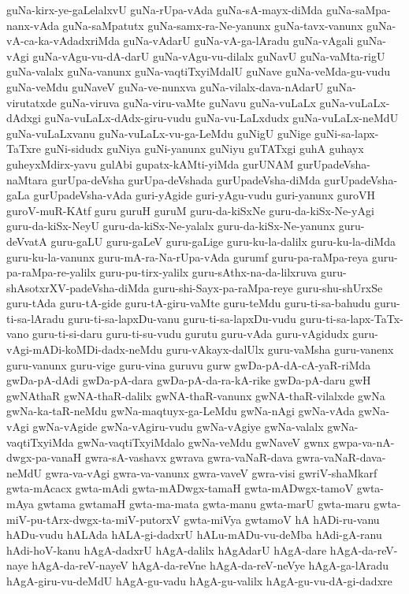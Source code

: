 {guNa-kirx-ye-gaLelalxvU
guNa-rUpa-vAda
guNa-sA-mayx-diMda
guNa-saMpa-nanx-vAda
guNa-saMpatutx
guNa-samx-ra-Ne-yanunx
guNa-tavx-vanunx
guNa-vA-ca-ka-vAdadxriMda
guNa-vAdarU
guNa-vA-ga-lAradu
guNa-vAgali
guNa-vAgi
guNa-vAgu-vu-dA-darU
guNa-vAgu-vu-dilalx
guNavU
guNa-vaMta-rigU
guNa-valalx
guNa-vanunx
guNa-vaqtiTxyiMdalU
guNave
guNa-veMda-gu-vudu
guNa-veMdu
guNaveV
guNa-ve-nunxva
guNa-vilalx-dava-nAdarU
guNa-virutatxde
guNa-viruva
guNa-viru-vaMte
guNavu
guNa-vuLaLx
guNa-vuLaLx-dAdxgi
guNa-vuLaLx-dAdx-giru-vudu
guNa-vu-LaLxdudx
guNa-vuLaLx-neMdU
guNa-vuLaLxvanu
guNa-vuLaLx-vu-ga-LeMdu
guNigU
guNige
guNi-sa-lapx-TaTxre
guNi-sidudx
guNiya
guNi-yanunx
guNiyu
guTATxgi
guhA
guhayx
guheyxMdirx-yavu
gulAbi
gupatx-kAMti-yiMda
gurUNAM
gurUpadeVsha-naMtara
gurUpa-deVsha
gurUpa-deVshada
gurUpadeVsha-diMda
gurUpadeVsha-gaLa
gurUpadeVsha-vAda
guri-yAgide
guri-yAgu-vudu
guri-yanunx
guroVH
guroV-muR-KAtf
guru
guruH
guruM
guru-da-kiSxNe
guru-da-kiSx-Ne-yAgi
guru-da-kiSx-NeyU
guru-da-kiSx-Ne-yalalx
guru-da-kiSx-Ne-yanunx
guru-deVvatA
guru-gaLU
guru-gaLeV
guru-gaLige
guru-ku-la-dalilx
guru-ku-la-diMda
guru-ku-la-vanunx
guru-mA-ra-Na-rUpa-vAda
gurumf
guru-pa-raMpa-reya
guru-pa-raMpa-re-yalilx
guru-pu-tirx-yalilx
guru-sAthx-na-da-lilxruva
guru-shAsotxrXV-padeVsha-diMda
guru-shi-Sayx-pa-raMpa-reye
guru-shu-shUrxSe
guru-tAda
guru-tA-gide
guru-tA-giru-vaMte
guru-teMdu
guru-ti-sa-bahudu
guru-ti-sa-lAradu
guru-ti-sa-lapxDu-vanu
guru-ti-sa-lapxDu-vudu
guru-ti-sa-lapx-TaTx-vano
guru-ti-si-daru
guru-ti-su-vudu
gurutu
guru-vAda
guru-vAgidudx
guru-vAgi-mADi-koMDi-dadx-neMdu
guru-vAkayx-dalUlx
guru-vaMsha
guru-vanenx
guru-vanunx
guru-vige
guru-vina
guruvu
gurw
gwDa-pA-dA-cA-yaR-riMda
gwDa-pA-dAdi
gwDa-pA-dara
gwDa-pA-da-ra-kA-rike
gwDa-pA-daru
gwH
gwNAthaR
gwNA-thaR-dalilx
gwNA-thaR-vanunx
gwNA-thaR-vilalxde
gwNa
gwNa-ka-taR-neMdu
gwNa-maqtuyx-ga-LeMdu
gwNa-nAgi
gwNa-vAda
gwNa-vAgi
gwNa-vAgide
gwNa-vAgiru-vudu
gwNa-vAgiye
gwNa-valalx
gwNa-vaqtiTxyiMda
gwNa-vaqtiTxyiMdalo
gwNa-veMdu
gwNaveV
gwnx
gwpa-va-nA-dwgx-pa-vanaH
gwra-sA-vashavx
gwrava
gwra-vaNaR-dava
gwra-vaNaR-dava-neMdU
gwra-va-vAgi
gwra-va-vanunx
gwra-vaveV
gwra-visi
gwriV-shaMkarf
gwta-mAcacx
gwta-mAdi
gwta-mADwgx-tamaH
gwta-mADwgx-tamoV
gwta-mAya
gwtama
gwtamaH
gwta-ma-mata
gwta-manu
gwta-marU
gwta-maru
gwta-miV-pu-tArx-dwgx-ta-miV-putorxV
gwta-miVya
gwtamoV
hA
hADi-ru-vanu
hADu-vudu
hALAda
hALA-gi-dadxrU
hALu-mADu-vu-deMba
hAdi-gA-ranu
hAdi-hoV-kanu
hAgA-dadxrU
hAgA-dalilx
hAgAdarU
hAgA-dare
hAgA-da-reV-naye
hAgA-da-reV-nayeV
hAgA-da-reVne
hAgA-da-reV-neVye
hAgA-ga-lAradu
hAgA-giru-vu-deMdU
hAgA-gu-vadu
hAgA-gu-valilx
hAgA-gu-vu-dA-gi-dadxre
}
